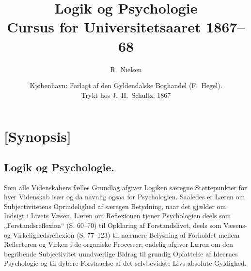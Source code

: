 \documentclass[11pt]{book}
\title{Logik og Psychologie\\[0.5em]
  \large Cursus for Universitetsaaret 1867--68}
\author{R.\ Nielsen}
\date{Kjøbenhavn: Forlagt af den Gyldendalske Boghandel (F.\ Hegel).\\
  Trykt hos J.\ H.\ Schultz. 1867}
\begin{document}
\maketitle
\tableofcontents


\frontmatter\pagestyle{empty}
\chapter*{[Synopsis]}

\section*{Logik og Psychologie.}

Som alle Videnskabers fælles Grundlag afgiver Logiken særegne
Støttepunkter for hver Videnskab især og da navnlig ogsaa for
Psychologien. Saaledes er Læren om Subjectivitetens Oprindelighed af
særegen Betydning, naar det gjælder om Indsigt i Livets Væsen. Læren om
Reflexionen tjener Psychologien deels som „Forstandsreflexion“
(S. 60--70) til Opklaring af Forstandslivet, deels som Væsens- og
Virkelighedsreflexion (S. 77--123) til nærmere Belysning af Forholdet
mellem Reflecteren og Virken i de organiske Processer; endelig afgiver
Læren om den begribende Subjectivitet uundværlige Bidrag til grundig
Opfattelse af Ideernes Psychologie og til dybere Forstaaelse af det
selvbevidste Livs absolute Gyldighed.
\end{document}
